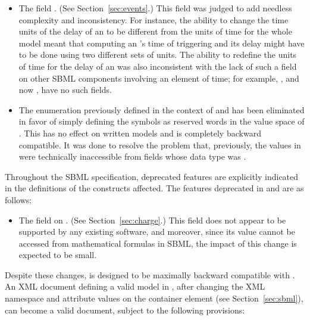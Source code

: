 \begin{blockChanged}
\begin{itemize}
\item The  field \Event.  (See
  Section~\ref{sec:events}.)  This field was judged to add
  needless complexity and inconsistency.  For instance, the
  ability to change the time units of the delay of an \Event to be
  different from the units of time for the whole model meant that
  computing an \Event's time of triggering and its delay might
  have to be done using two different sets of units.  The ability
  to redefine the units of time for the delay of an \Event was
  also inconsistent with the lack of such a field on other SBML
  components involving an element of time; for example, \RateRule,
  and now \KineticLaw, have no such fields.

\item The  enumeration previously defined in
  the context of \Unit and \UnitDefinition has been eliminated in
  favor of simply defining the symbols as reserved words in the
  value space of .  This has no effect on
  written models and is completely backward compatible.  It was
  done to resolve the problem that, previously, the values in
   were technically inaccessible from fields
  whose data type was .

\end{itemize}
Throughout the SBML specification, deprecated features are
explicitly indicated in the definitions of the constructs
affected.  The features deprecated in \sbmltwotwo and
\sbmltwothree are as follows:
\begin{itemize}
  
\item The  field on \Species.  (See
  Section~\ref{sec:charge}.)  This field does not appear to be
  supported by any existing software, and moreover, since its
  value cannot be accessed from mathematical formulas in SBML, the
  impact of this change is expected to be small.

\end{itemize}

Despite these changes, \sbmltwothree is designed to be maximally
backward compatible with \sbmltwoone.  An XML document defining a
valid model in \sbmltwoone, after changing the XML namespace and
 attribute values on the  container
element (see Section~\ref{sec:sbml}), can become a valid
\sbmltwothree document, subject to the following provisions:
\begin{enumerate}
  

\end{enumerate}
\end{blockChanged}
